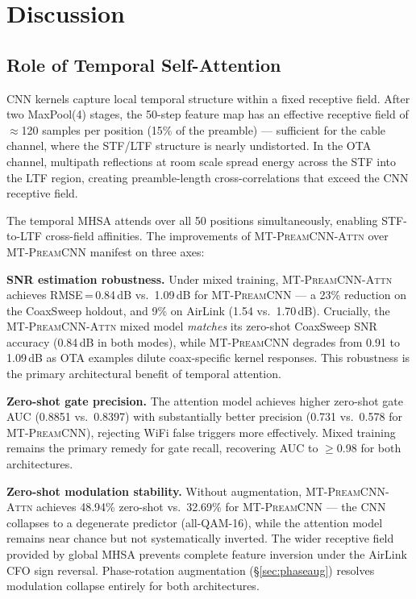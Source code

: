 \documentclass[conference]{IEEEtran}
\newcommand{\mtcnn}{\textsc{MT-PreamCNN}}
\newcommand{\mtcnnattn}{\textsc{MT-PreamCNN-Attn}}
\begin{document}
\section{Discussion}
\label{sec:discussion}

\subsection{Role of Temporal Self-Attention}
\label{sec:why_attn}

CNN kernels capture local temporal structure within a fixed receptive
field.
After two MaxPool(4) stages, the 50-step feature map has an effective
receptive field of $\approx$120 samples per position (15\% of the
preamble) — sufficient for the cable channel, where the
STF/LTF structure is nearly undistorted.
In the OTA channel, multipath reflections at room scale
spread energy across the STF into the LTF region, creating
preamble-length cross-correlations that exceed the CNN receptive field.

The temporal MHSA attends over all 50 positions simultaneously,
enabling STF-to-LTF cross-field affinities.
The improvements of \mtcnnattn{} over \mtcnn{} manifest on three axes:

\textbf{SNR estimation robustness.}
Under mixed training, \mtcnnattn{} achieves RMSE\,=\,0.84\,dB
vs.\ 1.09\,dB for \mtcnn{} — a 23\% reduction on the CoaxSweep holdout,
and 9\% on AirLink (1.54 vs.\ 1.70\,dB).
Crucially, the \mtcnnattn{} mixed model \emph{matches} its zero-shot
CoaxSweep SNR accuracy (0.84\,dB in both modes), while \mtcnn{} degrades
from 0.91 to 1.09\,dB as OTA examples dilute coax-specific kernel responses.
This robustness is the primary architectural benefit of temporal attention.

\textbf{Zero-shot gate precision.}
The attention model achieves higher zero-shot gate AUC (0.8851 vs.\ 0.8397)
with substantially better precision (0.731 vs.\ 0.578 for \mtcnn{}),
rejecting WiFi false triggers more effectively.
Mixed training remains the primary remedy for gate recall, recovering
AUC to $\ge$0.98 for both architectures.

\textbf{Zero-shot modulation stability.}
Without augmentation, \mtcnnattn{} achieves 48.94\% zero-shot
vs.\ 32.69\% for \mtcnn{} — the CNN collapses to a degenerate predictor
(all-QAM-16), while the attention model remains near chance but not
systematically inverted.
The wider receptive field provided by global MHSA prevents
complete feature inversion under the AirLink CFO sign reversal.
Phase-rotation augmentation (\S\ref{sec:phaseaug}) resolves
modulation collapse entirely for both architectures.
\end{document}
